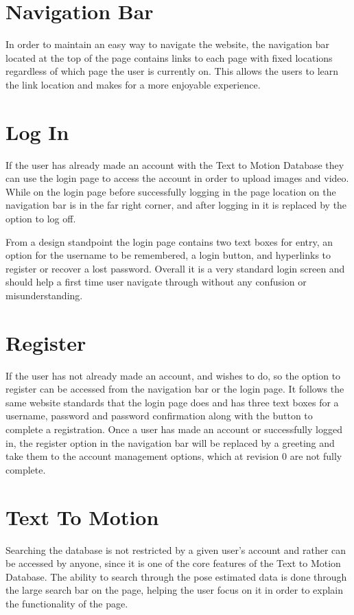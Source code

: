\documentclass{scrreprt}
\begin{document}
\section{Navigation Bar}

In order to maintain an easy way to navigate the website, the navigation bar
located at the top of the page contains links to each page with fixed locations
regardless of which page the user is currently on. This allows the users to
learn the link location and makes for a more enjoyable experience.

\section{Log In}

If the user has already made an account with the Text to Motion Database they
can use the login page to access the account in order to upload images and
video. While on the login page before successfully logging in the page location
on the navigation bar is in the far right corner, and after logging in it is
replaced by the option to log off.

From a design standpoint the login page contains two text boxes for entry, an
option for the username to be remembered, a login button, and hyperlinks to
register or recover a lost password. Overall it is a very standard login screen
and should help a first time user navigate through without any confusion or
misunderstanding.

\section{Register}

If the user has not already made an account, and wishes to do, so the option to
register can be accessed from the navigation bar or the login page. It follows
the same website standards that the login page does and has three text boxes
for a username, password and password confirmation along with the button to
complete a registration. Once a user has made an account or successfully logged
in, the register option in the navigation bar will be replaced by a greeting
and take them to the account management options, which at revision 0 are not
fully complete.

\section{Text To Motion}

Searching the database is not restricted by a given user's account and rather
can be accessed by anyone, since it is one of the core features of the Text to
Motion Database. The ability to search through the pose estimated data is done
through the large search bar on the page, helping the user focus on it in order
to explain the functionality of the page.
\end{document}
